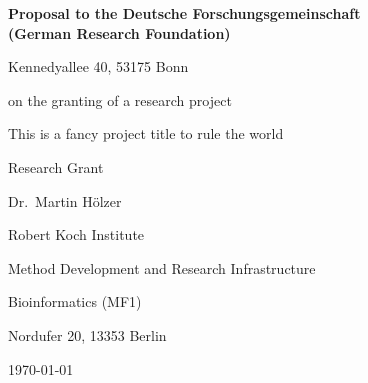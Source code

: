 {

  \vspace*{20ex}

  \begin{center}
  \large

  {\bfseries Proposal to the Deutsche Forschungsgemeinschaft\\(German Research Foundation)}

  Kennedyallee 40, 53175 Bonn

  \vspace{4ex}

  on the granting of a research project

  \vspace{9ex}

  \begin{bfseries}
    This is a fancy project title to rule the world
  \end{bfseries}

  \medskip

	 Research Grant

  \vspace{9ex}

	Dr.\ Martin H\"olzer

 	Robert Koch Institute
  
 	Method Development and Research Infrastructure

  Bioinformatics (MF1)

	Nordufer 20, 13353 Berlin
	 
	\vspace{9ex}

	\today
  \end{center}
}